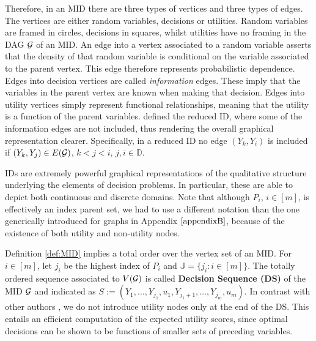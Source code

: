 Therefore, in an MID there are three types of vertices and three types of edges. The vertices are either random variables, decisions or utilities. Random variables are framed in circles, decisions in squares, whilst utilities have no framing in the DAG $\mathcal{G}$ of an MID. An edge into a vertex associated to a random variable asserts that the density of that random variable is conditional on the variable associated to the parent vertex. This edge therefore represents probabilistic dependence. Edges into decision vertices are called \textit{information} edges. These imply that the variables in the parent vertex are known when making that decision. Edges into utility vertices simply represent functional relationships, meaning that the utility is a function of the parent variables. \citet{Smith2010} defined the reduced ID, where some of the information edges are not included, thus rendering the overall graphical representation clearer. Specifically, in a reduced ID no edge $(Y_k,Y_i)$ is included if $(Y_k,Y_j)\in E(\mathcal{G})$, $k<j<i$, $j,i\in\mathbb{D}$. 

 IDs are extremely powerful graphical representations of the qualitative structure underlying the elements of decision problems. In particular, these are able to depict both continuous and discrete domains. Note that although $P_i$, $i\in [m]$, is effectively an index parent set, we had to use a different notation than the one generically introduced for graphs in Appendix $\ref{appendixB}$, because of the existence of both utility and non-utility nodes.

Definition \ref{def:MID} implies a total order over the vertex set of an MID. For $i\in[m]$, let $j_i$ be the highest index of $P_i$ and $\mathbb{J}=\{j_i:i\in[m]\}$. The totally ordered sequence associated to $V(\mathcal{G})$ is called \textbf{Decision Sequence (DS)} of the MID $\mathcal{G}$ and  indicated as   $S:=(Y_1,\dots,Y_{j_1},u_1,Y_{j_1+1},\dots,Y_{j_m},u_m)$.  In contrast with other authors \citep[e.g.][]{Jensen2009,Cowell1999a}, we do not introduce utility nodes only at the end of the DS. This entails an efficient computation of the expected utility scores, since optimal decisions can be shown to be functions of smaller sets of preceding variables.

